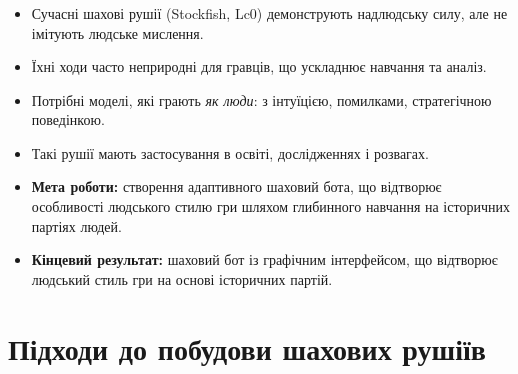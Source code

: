 \documentclass[
    10pt,
]{beamer}
\begin{document}

\begin{frame}[t]
    \frametitle{\insertsection}
    \begin{itemize}
        \item Сучасні шахові рушії (Stockfish, Lc0) демонструють надлюдську силу, але не імітують людське мислення.
        \item Їхні ходи часто неприродні для гравців, що ускладнює навчання та аналіз.
        \item Потрібні моделі, які грають \textit{як люди}: з інтуїцією, помилками, стратегічною поведінкою.
        \item Такі рушії мають застосування в освіті, дослідженнях і розвагах.
        \item \textbf{Мета роботи:} створення адаптивного шаховий бота, що відтворює особливості людського стилю гри шляхом глибинного навчання на історичних партіях людей.
        \item \textbf{Кінцевий результат:} шаховий бот із графічним інтерфейсом, що відтворює людський стиль гри на основі історичних партій.
    \end{itemize}
\end{frame}


\section{Підходи до побудови шахових рушіїв}

\end{document}
